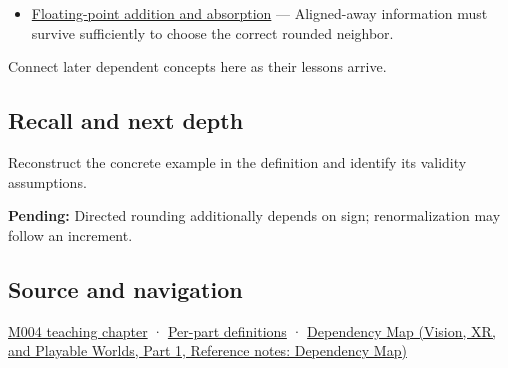 \hypertarget{appendix-b572b631069b-used-by}{}

\begin{itemize}
\tightlist
\item
  \hyperref[appendix-a1b1b4580dfd]{Floating-point addition and absorption} --- Aligned-away information must survive sufficiently to choose the correct rounded neighbor.
\end{itemize}

Connect later dependent concepts here as their lessons arrive.

\subsection{Recall and next depth}\label{appendix-b572b631069b-recall-and-next-depth}

\hypertarget{appendix-b572b631069b-recall-and-next-depth}{}

Reconstruct the concrete example in the definition and identify its validity assumptions.

\textbf{Pending:} Directed rounding additionally depends on sign; renormalization may follow an increment.

\subsection{Source and navigation}\label{appendix-b572b631069b-source-and-navigation}

\hypertarget{appendix-b572b631069b-source-and-navigation}{}

\hyperref[01-foundations-i-ch001-a-stretching-ruler-for-real-valued-quantities]{M004 teaching chapter} · \hyperref[appendix-fd090d982a15-m004---parts-61-76]{Per-part definitions} · \href{../07-Vision-XR-and-Playable-Worlds-P01/main.pdf\#appendix-4ad47bdd269a}{Dependency Map (Vision, XR, and Playable Worlds, Part 1, Reference notes: Dependency Map)}
